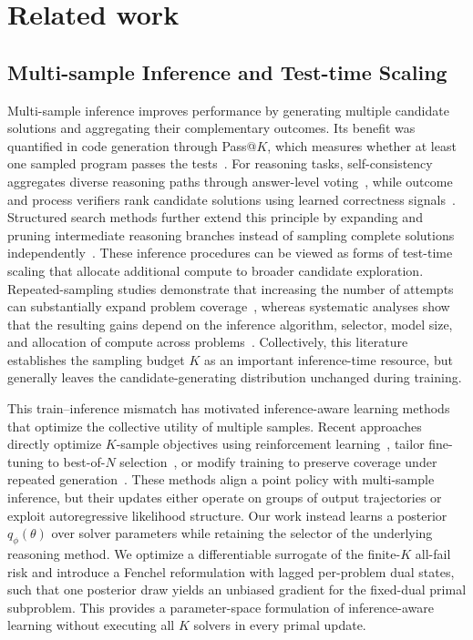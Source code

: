 \section{Related work}
\label{sec:related-work}

\subsection{Multi-sample Inference and Test-time Scaling}
\label{sec:related-multisample}

Multi-sample inference improves performance by generating multiple candidate solutions and aggregating their complementary outcomes.
Its benefit was quantified in code generation through Pass@$K$, which measures whether at least one sampled program passes the tests~\citep{chen2021codex}.
For reasoning tasks, self-consistency aggregates diverse reasoning paths through answer-level voting~\citep{wang2023selfconsistency}, while outcome and process verifiers rank candidate solutions using learned correctness signals~\citep{cobbe2021verifiers,lightman2024verify}.
Structured search methods further extend this principle by expanding and pruning intermediate reasoning branches instead of sampling complete solutions independently~\citep{yao2023tree}.
These inference procedures can be viewed as forms of test-time scaling that allocate additional compute to broader candidate exploration.
Repeated-sampling studies demonstrate that increasing the number of attempts can substantially expand problem coverage~\citep{brown2024monkeys}, whereas systematic analyses show that the resulting gains depend on the inference algorithm, selector, model size, and allocation of compute across problems~\citep{snell2024scaling,wu2025inferencescaling}.
Collectively, this literature establishes the sampling budget $K$ as an important inference-time resource, but generally leaves the candidate-generating distribution unchanged during training.

This train--inference mismatch has motivated inference-aware learning methods that optimize the collective utility of multiple samples.
Recent approaches directly optimize $K$-sample objectives using reinforcement learning~\citep{pmlr-v267-tang25o,walder2025pkpo}, tailor fine-tuning to best-of-$N$ selection~\citep{chow2025inferenceaware}, or modify training to preserve coverage under repeated generation~\citep{chen2025rethinking}.
These methods align a point policy with multi-sample inference, but their updates either operate on groups of output trajectories or exploit autoregressive likelihood structure.
Our work instead learns a posterior $q_\phi(\theta)$ over solver parameters while retaining the selector of the underlying reasoning method.
We optimize a differentiable surrogate of the finite-$K$ all-fail risk and introduce a Fenchel reformulation with lagged per-problem dual states, such that one posterior draw yields an unbiased gradient for the fixed-dual primal subproblem.
This provides a parameter-space formulation of inference-aware learning without executing all $K$ solvers in every primal update.

